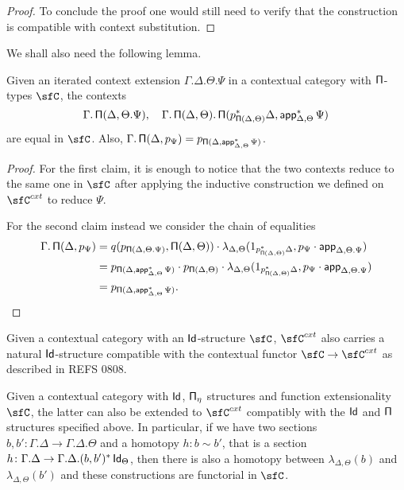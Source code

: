 \begin{proof}
  To conclude the proof one would still need to verify that the construction is
  compatible with context substitution.
\end{proof}


We shall also need the following lemma.

\begin{lem}\label{piequal}
  Given an iterated context extension $\Gamma.\Delta.\Theta.\Psi$ in a
  contextual category with $\operatorname{\mathsf{\Pi}}$-types $\sfC$, the contexts
  \[\Gamma.\operatorname{\mathsf{\Pi}}(\Delta,\Theta.\Psi),\quad\Gamma.\operatorname{\mathsf{\Pi}}(\Delta,\Theta).\operatorname{\mathsf{\Pi}}(p^*_{\operatorname{\mathsf{\Pi}}(\Delta,\Theta)}\Delta,\operatorname{\mathsf{app}}^*_{\Delta,\Theta}\Psi)\]
  are equal in $\sfC$. Also,
  $\Gamma.\operatorname{\mathsf{\Pi}}(\Delta,p_{\Psi})=p_{\operatorname{\mathsf{\Pi}}(\Delta,\operatorname{\mathsf{app}}^*_{\Delta,\Theta}\Psi)}$.
\end{lem}
\begin{proof}
  For the first claim, it is enough to notice that the two contexts reduce to
  the same one in $\sfC$ after applying the inductive construction we defined on
  $\sfC^{cxt}$ to reduce $\Psi$.

  For the second claim instead we consider the chain of equalities
  \begin{align*}
    \Gamma.\operatorname{\mathsf{\Pi}}(\Delta,p_{\Psi})
    &=q(p_{\operatorname{\mathsf{\Pi}}(\Delta,\Theta.\Psi)},\operatorname{\mathsf{\Pi}}(\Delta,\Theta))\cdot
    \lambda_{\Delta,\Theta}(1_{p^*_{\operatorname{\mathsf{\Pi}}(\Delta,\Theta)}\Delta},p_\Psi\cdot\operatorname{\mathsf{app}}_{\Delta,\Theta.\Psi}) \\
    &=p_{\operatorname{\mathsf{\Pi}}(\Delta,\operatorname{\mathsf{app}}^*_{\Delta,\Theta}\Psi)}\cdot
    p_{\operatorname{\mathsf{\Pi}}(\Delta,\Theta)}\cdot
    \lambda_{\Delta,\Theta}(1_{p^*_{\operatorname{\mathsf{\Pi}}(\Delta,\Theta)}\Delta},p_\Psi\cdot\operatorname{\mathsf{app}}_{\Delta,\Theta.\Psi}) \\
    &=p_{\operatorname{\mathsf{\Pi}}(\Delta,\operatorname{\mathsf{app}}^*_{\Delta,\Theta}\Psi)}.
  \end{align*}
\end{proof}


\begin{prop}\cite[Prop.\ 3.3.1]{Gar09b}
  Given a contextual category with an $\operatorname{\mathsf{Id}}$-structure $\sfC$, $\sfC^{cxt}$ also
  carries a natural $\operatorname{\mathsf{Id}}$-structure compatible with the contextual functor
  $\sfC\rightarrow\sfC^{cxt}$ as described in REFS 0808.
\end{prop}

\begin{lem}\cite[Lemma 2.28]{1808}
  Given a contextual category with $\operatorname{\mathsf{Id}}$, $\operatorname{\mathsf{\Pi}_\eta}$ structures and function
  extensionality $\sfC$, the latter can also be extended to $\sfC^{cxt}$
  compatibly with the $\operatorname{\mathsf{Id}}$ and $\operatorname{\mathsf{\Pi}}$ structures specified above. In particular,
  if we have two sections
  $b,b'\colon\Gamma.\Delta\rightarrow\Gamma.\Delta.\Theta$ and a homotopy
  $h:b\sim b'$, that is a section
  $h\colon\Gamma.\Delta\rightarrow\Gamma.\Delta.(b,b')^*\operatorname{\mathsf{Id}}_{\Theta}$,
  then there is also a homotopy between $\lambda_{\Delta,\Theta}(b)$ and
  $\lambda_{\Delta,\Theta}(b')$ and these constructions are functorial in $\sfC$.
\end{lem}

